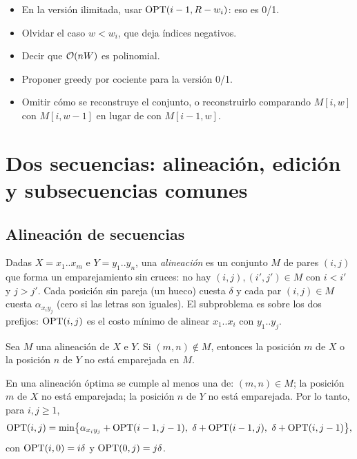 \begin{trampa}[mochila]
\begin{itemize}[leftmargin=1.2em]
  \item En la versión ilimitada, usar $\mathrm{OPT}(i-1,R-w_i)$: eso es 0/1.
  \item Olvidar el caso $w<w_i$, que deja índices negativos.
  \item Decir que $\mathcal{O}(nW)$ es polinomial.
  \item Proponer greedy por cociente para la versión 0/1.
  \item Omitir cómo se reconstruye el conjunto, o reconstruirlo comparando
  $M[i,w]$ con $M[i,w-1]$ en lugar de con $M[i-1,w]$.
\end{itemize}
\end{trampa}

\section{Dos secuencias: alineación, edición y subsecuencias comunes}

\subsection{Alineación de secuencias}

Dadas $X=x_1..x_m$ e $Y=y_1..y_n$, una \emph{alineación} es un conjunto $M$
de pares $(i,j)$ que forma un emparejamiento sin cruces: no hay
$(i,j),(i',j')\in M$ con $i<i'$ y $j>j'$. Cada posición sin pareja (un hueco)
cuesta $\delta$ y cada par $(i,j)\in M$ cuesta $\alpha_{x_iy_j}$ (cero si las
letras son iguales). El subproblema es sobre los dos prefijos: $\mathrm{OPT}(i,j)$ es
el costo mínimo de alinear $x_1..x_i$ con $y_1..y_j$.

\begin{resultado}[(6.14)]
Sea $M$ una alineación de $X$ e $Y$. Si $(m,n)\notin M$, entonces la posición
$m$ de $X$ o la posición $n$ de $Y$ no está emparejada en $M$.
\end{resultado}

\begin{resultado}[(6.15) y (6.16)]
En una alineación óptima se cumple al menos una de: $(m,n)\in M$; la
posición $m$ de $X$ no está emparejada; la posición $n$ de $Y$ no está
emparejada. Por lo tanto, para $i,j\ge1$,
\[
\OPT(i,j)=\min\bigl\{\alpha_{x_iy_j}+\OPT(i-1,j-1),\ \delta+\OPT(i-1,j),\ \delta+\OPT(i,j-1)\bigr\},
\]
con $\mathrm{OPT}(i,0)=i\delta$ y $\mathrm{OPT}(0,j)=j\delta$.
\end{resultado}

